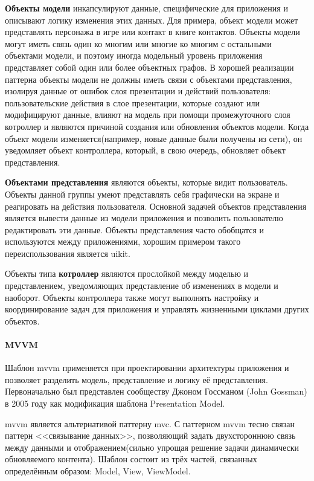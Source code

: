 \textbf{Объекты модели} инкапсулируют данные, специфические для приложения и описывают логику изменения этих данных. Для примера, объект модели может представлять персонажа в игре или контакт в книге контактов. Объекты модели могут иметь связь один ко многим или многие ко многим с остальными объектами модели, и поэтому иногда модельный уровень приложения представляет собой один или более объектных графов. В хорошей реализации паттерна объекты модели не должны иметь связи с объектами представления, изолируя данные от ошибок слоя презентации и действий пользователя: пользовательские действия в слое презентации, которые создают или модифицируют данные, влияют на модель при помощи промежуточного слоя котроллер и являются причиной создания или обновления объектов модели. Когда объект модели изменяется(например, новые данные были получены из сети), он уведомляет объект контроллера, который, в свою очередь, обновляет объект представления.

\textbf{Объектами представления} являются объекты, которые видит пользователь. Объекты данной группы умеют представлять себя графически на экране и реагировать на действия пользователя. Основной задачей объектов представления является вывести данные из модели приложения и позволить пользователю редактировать эти данные. Объекты представления часто обобщатся и используются между приложениями, хорошим примером такого переиспользования является \gls{uikit}. 

Объекты типа \textbf{котроллер} являются прослойкой между моделью и представлением, уведомляющих представление об изменениях в модели и наоборот. Объекты контроллера также могут выполнять настройку и координирование задач для приложения и управлять жизненными циклами других объектов. 

\paragraph {MVVM}
Шаблон \gls{mvvm} применяется при проектировании архитектуры приложения и позволяет разделить модель, представление и логику её представления. Первоначально был представлен сообществу Джоном Госсманом (John Gossman) в 2005 году как модификация шаблона Presentation Model. \cite{wiki:mvvm}

\gls{mvvm} является альтернативой паттерну \gls{mvc}. С паттерном \gls{mvvm} тесно связан паттерн <<связывание данных>>, позволяющий задать двухстороннюю связь между данными и отображением(сильно упрощая решение задачи динамически обновляемого контента). Шаблон состоит из трёх частей, связанных определённым образом: Model, View, ViewModel.

